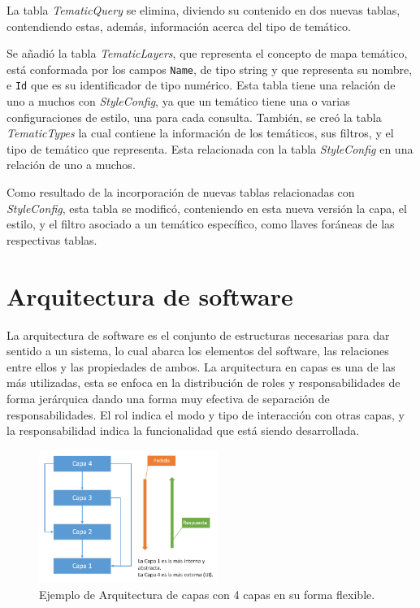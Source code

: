 La tabla \textit{TematicQuery} se elimina, diviendo su contenido en dos nuevas tablas, contendiendo estas, adem\'as, informaci\'on acerca del tipo de tem\'atico.

Se a\~nadi\'o la tabla \textit{TematicLayers}, que representa el concepto de mapa tem\'atico, est\'a conformada por los campos \texttt{Name}, de tipo string y que representa su nombre, e \texttt{Id} que es su identificador de tipo num\'erico. Esta tabla tiene una relaci\'on de uno a muchos con \textit{StyleConfig}, ya que un tem\'atico tiene una o varias configuraciones de estilo, una para cada consulta. Tambi\'en, se cre\'o la tabla \textit{TematicTypes} la cual contiene la informaci\'on de los tem\'aticos, sus filtros, y el tipo de tem\'atico que representa. Esta relacionada con la tabla \textit{StyleConfig} en una relaci\'on de uno a muchos.

Como resultado de la incorporaci\'on de nuevas tablas relacionadas con \textit{StyleConfig}, esta tabla se modific\'o, conteniendo en esta nueva versi\'on la capa, el estilo, y el filtro asociado a un tem\'atico espec\'ifico, como llaves for\'aneas de las respectivas tablas.


\section{Arquitectura de software}
La arquitectura de software es el conjunto de estructuras necesarias para dar sentido a un sistema, lo cual abarca los elementos del software, las relaciones entre ellos y las propiedades de ambos. La arquitectura en capas es una de las m\'as utilizadas, esta se enfoca en la distribuci\'on de roles y responsabilidades de forma jer\'arquica dando una forma muy efectiva de separaci\'on de responsabilidades. El rol indica el modo y tipo de interacci\'on con otras capas, y la responsabilidad indica la funcionalidad que est\'a siendo desarrollada. \cite{arquitecture2}

\begin{figure} 
\vspace{-20pt} 
\begin{center} 
\includegraphics[width=0.52\textwidth]{images/arquitecturaFlexible.png} 
\end{center} \vspace{-20pt} \caption{Ejemplo de Arquitectura de capas con 4 capas en su forma flexible.} \label{flexible} \vspace{-10pt} 
\end{figure}

